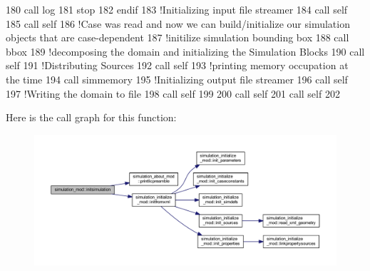 \begin{DoxyCode}
180         \textcolor{keyword}{call }log%
181         stop
182 \textcolor{keywordflow}{    endif}
183     \textcolor{comment}{!Initializing input file streamer}
184     \textcolor{keyword}{call }self%
185     \textcolor{keyword}{call }self%
186     \textcolor{comment}{!Case was read and now we can build/initialize our simulation objects that are case-dependent}
187     \textcolor{comment}{!initilize simulation bounding box}
188     \textcolor{keyword}{call }bbox%
189     \textcolor{comment}{!decomposing the domain and initializing the Simulation Blocks}
190     \textcolor{keyword}{call }self%
191     \textcolor{comment}{!Distributing Sources}
192     \textcolor{keyword}{call }self%
193     \textcolor{comment}{!printing memory occupation at the time}
194     \textcolor{keyword}{call }simmemory%
195     \textcolor{comment}{!Initializing output file streamer}
196     \textcolor{keyword}{call }self%
197     \textcolor{comment}{!Writing the domain to file}
198     \textcolor{keyword}{call }self%
199 
200     \textcolor{keyword}{call }self%
201     \textcolor{keyword}{call }self%
202 
\end{DoxyCode}
Here is the call graph for this function\+:\nopagebreak
\begin{figure}[H]
\begin{center}
\leavevmode
\includegraphics[width=350pt]{namespacesimulation__mod_aedbba2bb458cbcd7eb93938a5f7b5940_cgraph}
\end{center}
\end{figure}
\mbox{\label{namespacesimulation__mod_a629f51ee8ca4d2ece7f039a0114b1ef4}} 
